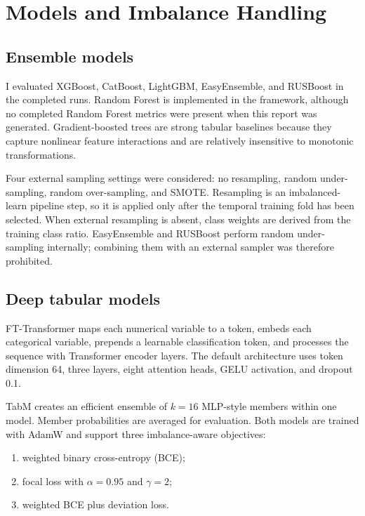 \documentclass[11pt,a4paper]{article}
\begin{document}
\section{Models and Imbalance Handling}

\subsection{Ensemble models}

I evaluated XGBoost, CatBoost, LightGBM, EasyEnsemble, and RUSBoost in the completed runs. Random Forest is implemented in the framework, although no completed Random Forest metrics were present when this report was generated. Gradient-boosted trees are strong tabular baselines because they capture nonlinear feature interactions and are relatively insensitive to monotonic transformations.

Four external sampling settings were considered: no resampling, random under-sampling, random over-sampling, and SMOTE. Resampling is an imbalanced-learn pipeline step, so it is applied only after the temporal training fold has been selected. When external resampling is absent, class weights are derived from the training class ratio. EasyEnsemble and RUSBoost perform random under-sampling internally; combining them with an external sampler was therefore prohibited.

\subsection{Deep tabular models}

FT-Transformer maps each numerical variable to a token, embeds each categorical variable, prepends a learnable classification token, and processes the sequence with Transformer encoder layers. The default architecture uses token dimension 64, three layers, eight attention heads, GELU activation, and dropout 0.1.

TabM creates an efficient ensemble of $k=16$ MLP-style members within one model. Member probabilities are averaged for evaluation. Both models are trained with AdamW and support three imbalance-aware objectives:
\begin{enumerate}
    \item weighted binary cross-entropy (BCE);
    \item focal loss with $\alpha=0.95$ and $\gamma=2$;
    \item weighted BCE plus deviation loss.
\end{enumerate}
\end{document}
